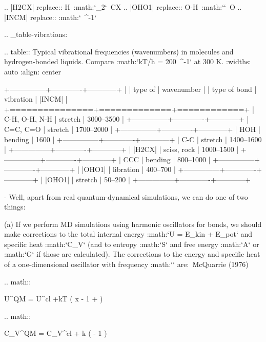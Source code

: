 .. |H2CX| replace:: H\ :math:`_2`\ CX
.. |OHO1| replace:: O-H\ :math:`\cdots`\ O
.. |INCM| replace:: :math:`~^{-1}`

.. _table-vibrations:

.. table::
        Typical vibrational frequencies (wavenumbers) in molecules and hydrogen-bonded
        liquids. Compare :math:`kT/h = 200~^{-1}` at 300 K.
        :widths: auto
        :align: center

        +---------------+-------------+------------+
        |               | type of     | wavenumber |
        | type of bond  | vibration   | |INCM|     |
        +===============+=============+============+
        | C-H, O-H, N-H | stretch     | 3000--3500 |
        +---------------+-------------+------------+
        | C=C, C=O      | stretch     | 1700--2000 |
        +---------------+-------------+------------+
        | HOH           | bending     | 1600       |
        +---------------+-------------+------------+
        | C-C           | stretch     | 1400--1600 |
        +---------------+-------------+------------+
        | |H2CX|        | sciss, rock | 1000--1500 |
        +---------------+-------------+------------+
        | CCC           | bending     |  800--1000 |
        +---------------+-------------+------------+
        | |OHO1|        | libration   |  400--700  |
        +---------------+-------------+------------+
        | |OHO1|        | stretch     |   50--200  |
        +---------------+-------------+------------+



-     Well, apart from real quantum-dynamical simulations, we can do one
      of two things:

      (a)   If we perform MD simulations using harmonic oscillators for
            bonds, we should make corrections to the total internal energy
            :math:`U = E_{kin} + E_{pot}` and specific heat :math:`C_V` (and
            to entropy :math:`S` and free energy :math:`A` or :math:`G` if
            those are calculated). The corrections to the energy and specific
            heat of a one-dimensional oscillator with frequency :math:`\nu`
            are: McQuarrie (1976)

            .. math:: 

               U^{QM} = U^{cl} +kT \left( {}x - 1 +  \right)

            .. math:: 

               C_V^{QM} = C_V^{cl} + k \left(  - 1 \right)

